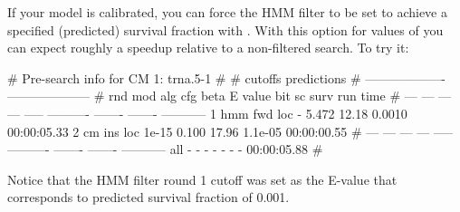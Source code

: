 If your model is calibrated, you can force the HMM filter to be set to
achieve a specified (predicted) survival fraction with
. With this option for values of 
you can expect roughly a  speedup relative to a
non-filtered search. To try it: 



\begin{sreoutput}
# Pre-search info for CM 1: trna.5-1
#
#                                  cutoffs            predictions     
#                            -------------------  --------------------
# rnd  mod  alg  cfg   beta     E value   bit sc     surv     run time
# ---  ---  ---  ---  -----  ----------  -------  -------  -----------
    1  hmm  fwd  loc      -       5.472    12.18   0.0010  00:00:05.33
    2   cm  ins  loc  1e-15       0.100    17.96  1.1e-05  00:00:00.55
# ---  ---  ---  ---  -----  ----------  -------  -------  -----------
  all    -    -    -      -           -        -        -  00:00:05.88
#
\end{sreoutput}
\begin{comment}
# Post-search info for CM 1: trna.5-1
#
#                              number of hits       surv fraction  
#                            -------------------  -----------------
# rnd  mod  alg  cfg   beta    expected   actual  expected   actual
# ---  ---  ---  ---  -----  ----------  -------  --------  -------
    1  hmm  fwd  loc      -       5.472        2    0.0010   0.0003
    2   cm  ins  loc  1e-15       0.100        1   1.1e-05   0.0001
#
# expected time    actual time
# -------------  -------------
    00:00:05.88    00:00:06.00
\end{comment}

Notice that the HMM filter round 1 cutoff was set as the E-value 
that corresponds to predicted survival fraction of 0.001.

